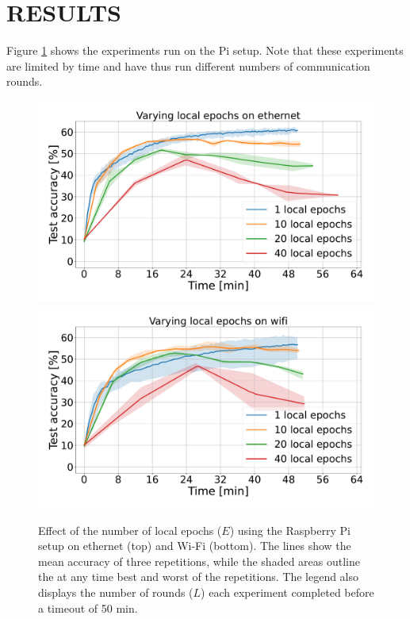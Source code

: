\documentclass{article}
\begin{document}
\section{RESULTS}%
\label{sec:results}
Figure \ref{fig:rpi-local-epochs} shows the experiments run on the Pi setup.
Note that these experiments are limited by time and have thus run different numbers of communication rounds.
\begin{figure}[htb!]
    \centering
    \includegraphics[width=\linewidth]{imgs/time_avg_local_epochs_ethernet.pdf}
    \includegraphics[width=\linewidth]{imgs/time_avg_local_epochs_wifi.pdf}
    \caption{Effect of the number of local epochs ($E$) using the Raspberry Pi setup on ethernet (top) and Wi-Fi (bottom).
    The lines show the mean accuracy of three repetitions, while the shaded areas outline the at any time best and worst of the repetitions.
    The legend also displays the number of rounds ($L$) each experiment completed before a timeout of 50 min.
}
    \label{fig:rpi-local-epochs}
\end{figure}\noindent
\end{document}
